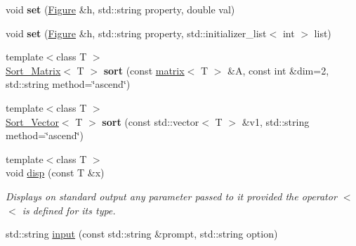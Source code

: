 \begin{DoxyCompactItemize}
\item 
\hypertarget{namespacekeycpp_afcd6ae07fc18f5374868fe314f00108c}{void {\bfseries set} (\hyperlink{classkeycpp_1_1_figure}{Figure} \&h, std\-::string property, double val)}\label{namespacekeycpp_afcd6ae07fc18f5374868fe314f00108c}

\item 
\hypertarget{namespacekeycpp_a261a9d83dcc8786777d193575b7e1a1c}{void {\bfseries set} (\hyperlink{classkeycpp_1_1_figure}{Figure} \&h, std\-::string property, std\-::initializer\-\_\-list$<$ int $>$ list)}\label{namespacekeycpp_a261a9d83dcc8786777d193575b7e1a1c}

\item 
\hypertarget{namespacekeycpp_aa2641f24e5cec5eddddbd6de2159055f}{{\footnotesize template$<$class T $>$ }\\\hyperlink{structkeycpp_1_1_sort___matrix}{Sort\-\_\-\-Matrix}$<$ T $>$ {\bfseries sort} (const \hyperlink{classkeycpp_1_1matrix}{matrix}$<$ T $>$ \&A, const int \&dim=2, std\-::string method=\char`\"{}ascend\char`\"{})}\label{namespacekeycpp_aa2641f24e5cec5eddddbd6de2159055f}

\item 
\hypertarget{namespacekeycpp_adba3dbd0ed8ce919ffcd445bcf273673}{{\footnotesize template$<$class T $>$ }\\\hyperlink{structkeycpp_1_1_sort___vector}{Sort\-\_\-\-Vector}$<$ T $>$ {\bfseries sort} (const std\-::vector$<$ T $>$ \&v1, std\-::string method=\char`\"{}ascend\char`\"{})}\label{namespacekeycpp_adba3dbd0ed8ce919ffcd445bcf273673}

\item 
\hypertarget{namespacekeycpp_a6a8a286886d48471685b18b7782f1e4a}{{\footnotesize template$<$class T $>$ }\\void \hyperlink{namespacekeycpp_a6a8a286886d48471685b18b7782f1e4a}{disp} (const T \&x)}\label{namespacekeycpp_a6a8a286886d48471685b18b7782f1e4a}

\begin{DoxyCompactList}\small\item\em Displays on standard output any parameter passed to it provided the operator $<$$<$ is defined for its type. \end{DoxyCompactList}\item 
\hypertarget{namespacekeycpp_aba69db64fe38ad271de1939d3f1a5520}{std\-::string \hyperlink{namespacekeycpp_aba69db64fe38ad271de1939d3f1a5520}{input} (const std\-::string \&prompt, std\-::string option)}\label{namespacekeycpp_aba69db64fe38ad271de1939d3f1a5520}


\end{DoxyCompactItemize}
